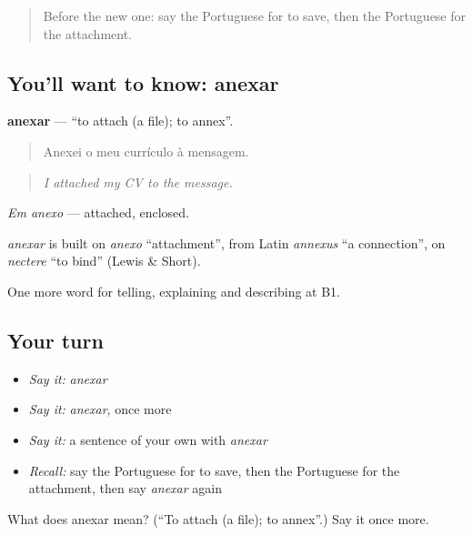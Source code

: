 \label{lesson:PT-C398-anexar}



\begin{quote}
Before the new one: say the Portuguese for to save, then the Portuguese for the attachment.
\end{quote}

\subsection*{You'll want to know: anexar}
\textbf{anexar} — \textquotedblleft{}to attach (a file); to annex\textquotedblright{}.

\begin{quote}
Anexei o meu currículo à mensagem.
\end{quote}

\begin{quote}
\emph{I attached my CV to the message.}
\end{quote}

\emph{Em anexo} — attached, enclosed.

\begin{cousinweb}
\emph{anexar} is built on \emph{anexo} \textquotedblleft{}attachment\textquotedblright{}, from Latin \emph{annexus} \textquotedblleft{}a connection\textquotedblright{}, on \emph{nectere} \textquotedblleft{}to bind\textquotedblright{} (Lewis \& Short).
\end{cousinweb}

\begin{grammarlens}[title={What you've built}]
One more word for telling, explaining and describing at B1.
\end{grammarlens}

\subsection*{Your turn}
\begin{itemize}
\raggedright
  \item \emph{Say it:} \emph{anexar}
  \item \emph{Say it:} \emph{anexar}, once more
  \item \emph{Say it:} a sentence of your own with \emph{anexar}
  \item \emph{Recall:} say the Portuguese for to save, then the Portuguese for the attachment, then say \emph{anexar} again
\end{itemize}

\begin{tcolorbox}[breakable,colback=teal!4,colframe=teal!35!black,title={Before you move on}]
What does anexar mean? (\textquotedblleft{}To attach (a file); to annex\textquotedblright{}.) Say it once more.
\end{tcolorbox}
